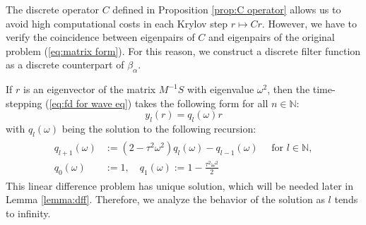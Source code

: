 \documentclass[a4paper,11pt,bibliography=totoc,listof=totoc,headinclude=true,cleardoublepage=empty,oneside]{scrbook}
\newcommand{\N}{\mathbb{N}}
\renewcommand{\eqref}[1]{(\ref{#1})}
\begin{document}
The discrete operator $C$ defined in Proposition \ref{prop:C operator} allows us to avoid high computational costs in each Krylov step $r \mapsto Cr$. However, we have to verify the coincidence between eigenpairs of $C$ and eigenpairs of the original problem \eqref{eq:matrix form}. For this reason, we construct a discrete filter function as a discrete counterpart of $\beta_\alpha$.

If $r$ is an eigenvector of the matrix $M^{-1}S$ with eigenvalue $\omega^2$, then the time-stepping \eqref{eq:fd for wave eq} takes the following form for all $n\in \N$:
\begin{equation}\label{eq:y_l q_l}
    y_l(r) = q_l(\omega)r  
\end{equation}
with $q_l(\omega)$ being the solution to the following recursion:
\begin{align}\label{eq:q def}
    \begin{split}
        q_{l+1}(\omega) &:= (2-\tau^2\omega^2) q_l(\omega) - q_{l-1}(\omega) \quad \text{ for } l \in \N,\\
        q_0(\omega) &:= 1, \quad q_1(\omega) := 1 - \frac{\tau^2\omega^2}{2} 
    \end{split}
\end{align}
This linear difference problem has unique solution, which will be needed later in Lemma \ref{lemma:dff}. Therefore, we analyze the behavior of the solution as $l$ tends to infinity.
\end{document}
